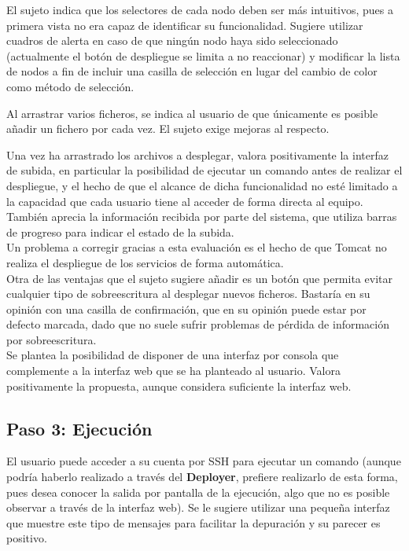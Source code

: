 El sujeto indica que los selectores de cada nodo deben ser más intuitivos, pues a primera vista no era capaz de identificar su funcionalidad. Sugiere utilizar cuadros de alerta en caso de que ningún nodo haya sido seleccionado (actualmente el botón de despliegue se limita a no reaccionar) y modificar la lista de nodos a fin de incluir una casilla de selección en lugar del cambio de color como método de selección.

Al arrastrar varios ficheros, se indica al usuario de que únicamente es posible añadir un fichero por cada vez. El sujeto exige mejoras al respecto. %

Una vez ha arrastrado los archivos a desplegar, valora positivamente la interfaz de subida, en particular la posibilidad de ejecutar un comando antes de realizar el despliegue, y el hecho de que el alcance de dicha funcionalidad no esté limitado a la capacidad que cada usuario tiene al acceder de forma directa al equipo. También aprecia la información recibida por parte del sistema, que utiliza barras de progreso para indicar el estado de la subida.\\

Un problema a corregir gracias a esta evaluación es el hecho de que Tomcat no realiza el despliegue de los servicios de forma automática.\\

Otra de las ventajas que el sujeto sugiere añadir es un botón que permita evitar cualquier tipo de sobreescritura al desplegar nuevos ficheros. Bastaría en su opinión con una casilla de confirmación, que en su opinión puede estar por defecto marcada, dado que no suele sufrir problemas de pérdida de información por sobreescritura.\\

Se plantea la posibilidad de disponer de una interfaz por consola que complemente a la interfaz web que se ha planteado al usuario. Valora positivamente la propuesta, aunque considera suficiente la interfaz web.\\

\subsection{Paso 3: Ejecución}

El usuario puede acceder a su cuenta por SSH para ejecutar un comando (aunque podría haberlo realizado a través del \textbf{Deployer}, prefiere realizarlo de esta forma, pues desea conocer la salida por pantalla de la ejecución, algo que no es posible observar a través de la interfaz web). Se le sugiere utilizar una pequeña interfaz que muestre este tipo de mensajes para facilitar la depuración y su parecer es positivo.

